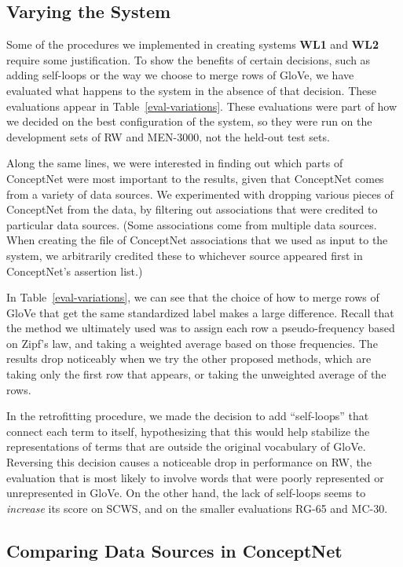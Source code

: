 \documentclass[letterpaper]{article}
\begin{document}
\subsection{Varying the System}

Some of the procedures we implemented in creating systems {\bf WL1} and
{\bf WL2} require some justification. To show the benefits of certain decisions,
such as adding self-loops or the way we choose to merge rows of GloVe, we have
evaluated what happens to the system in the absence of that decision. These
evaluations appear in Table~\ref{eval-variations}. These evaluations were
part of how we decided on the best configuration of the system, so they were
run on the development sets of RW and MEN-3000, not the held-out test sets.

Along the same lines, we were interested in finding out which parts of
ConceptNet were most important to the results, given that ConceptNet comes from
a variety of data sources. We experimented with dropping various pieces of
ConceptNet from the data, by filtering out associations that were credited to
particular data sources. (Some associations come from multiple data sources.
When creating the file of ConceptNet associations that we used as input to the
system, we arbitrarily credited these to whichever source appeared first in
ConceptNet's assertion list.)

In Table~\ref{eval-variations}, we can see that the choice of how to merge
rows of GloVe that get the same standardized label makes a large difference.
Recall that the method we ultimately used was to assign each row a
pseudo-frequency based on Zipf's law, and taking a weighted average based on
those frequencies. The results drop noticeably when we try the other proposed
methods, which are taking only the first row that appears, or taking the
unweighted average of the rows.

In the retrofitting procedure, we made the decision to add ``self-loops'' that
connect each term to itself, hypothesizing that this would help stabilize the
representations of terms that are outside the original vocabulary of GloVe.
Reversing this decision causes a noticeable drop in performance on RW, the
evaluation that is most likely to involve words that were poorly represented or
unrepresented in GloVe. On the other hand, the lack of self-loops seems to {\em
increase} its score on SCWS, and on the smaller evaluations RG-65 and MC-30.

\subsection{Comparing Data Sources in ConceptNet}
\end{document}
